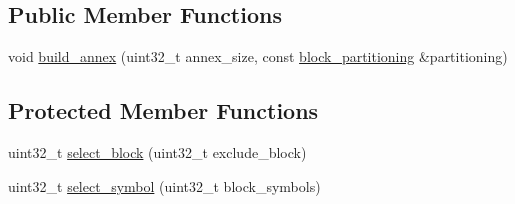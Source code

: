 \subsection*{Public Member Functions}
\begin{DoxyCompactItemize}
\item 
void \hyperlink{classkodo_1_1random__annex__base_acafec787f6330df1804cc0cc36d2fd75}{build\-\_\-annex} (uint32\-\_\-t annex\-\_\-size, const \hyperlink{classkodo_1_1random__annex__base_a2853201f19ed35facc0d41a936379d17}{block\-\_\-partitioning} \&partitioning)
\end{DoxyCompactItemize}
\subsection*{Protected Member Functions}
\begin{DoxyCompactItemize}
\item 
uint32\-\_\-t \hyperlink{classkodo_1_1random__annex__base_a039cf58b6cc56adc6cd7ed4865fbcedc}{select\-\_\-block} (uint32\-\_\-t exclude\-\_\-block)
\item 
uint32\-\_\-t \hyperlink{classkodo_1_1random__annex__base_a4691622d46017f89de8f0d4c5efe0f2a}{select\-\_\-symbol} (uint32\-\_\-t block\-\_\-symbols)
\end{DoxyCompactItemize}
